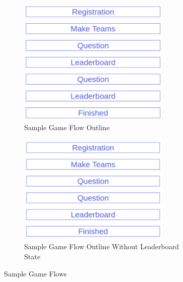 \documentclass{article}
\begin{document}
            \begin{figure}[ht]
                \centering
                \begin{subfigure}[b]{0.45\textwidth}
                    \centering
                    \includegraphics[width=0.8\textwidth]{images/architecture-flow.png}
                    \caption{Sample Game Flow Outline}
                    \label{fig:architecutre-flow}
                \end{subfigure}
                \begin{subfigure}[b]{0.45\textwidth}
                    \centering
                    \includegraphics[width=0.8\textwidth]{images/architecture-flow2.png}
                    \caption{Sample Game Flow Outline Without Leaderboard State}
                    \label{fig:architecutre-flow2}
                \end{subfigure}
                \caption{Sample Game Flows}\label{fig:architecutre-game_flows}
            \end{figure}
\end{document}
